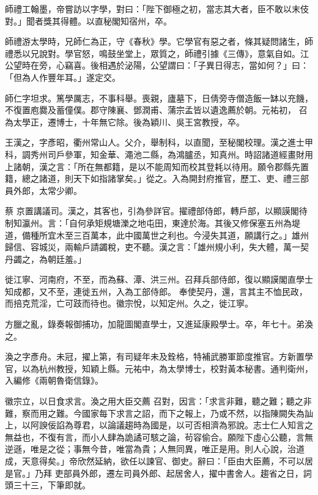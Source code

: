 \begin{pinyinscope}
 師禮工翰墨，帝嘗訪以字學，對曰：「陛下御極之初，當志其大者，臣不敢以末伎
 對。」聞者獎其得體。以直秘閣知宿州，卒。



 師禮游太學時，兄師仁為正，守《春秋》學。它學官有惡之者，條其疑問諸生，師禮悉以兄說對。學官怒，鳴鼓坐堂上，眾質之，師禮引據《三傳》，意氣自如。江公望時在旁，心竊喜。後相遇於泌陽，公望謂曰：「子異日得志，當如何？」曰：「但為人作豐年耳。」遂定交。



 師仁字坦求。篤學厲志，不事科舉。喪親，廬墓下，日倩旁寺僧造飯一缽以充饑，不復置庖爨及蓄僮僕。郡守陳襄、鄧潤甫、蒲宗孟皆以遺逸薦於朝。元祐初，
 召為太學正，遷博士，十年無它除。後為穎川、吳王宮教授，卒。



 王漢之，字彥昭，衢州常山人。父介，舉制科，以直聞，至秘閣校理。漢之進士甲科，調秀州司戶參軍，知金華、澠池二縣，為鴻臚丞，知真州。時詔諸道經畫財用上諸朝，漢之言：「所在無都籍，是以不能周知而校其登耗以待用。願令郡縣先置籍，總之諸道，則天下如指諸掌矣。」從之。入為開封府推官，歷工、吏、禮三部員外郎，太常少卿。



 蔡
 京置講議司。漢之，其客也，引為參詳官。擢禮部侍郎，轉戶部，以顯謨閣待制知瀛州。言：「自何承矩規塘濼之地屯田，東達於海。其後又修保塞五州為堤道，備種所宜木至三百萬本，此中國萬世之利也。今浸失其道，願講行之。」雄州歸信、容城災，兩輸戶請蠲稅，吏不聽。漢之言：「雄州規小利，失大體，萬一契丹蠲之，為朝廷羞。」



 徙江寧、河南府，不至，而為蘇、潭、洪三州。召拜兵部侍郎，復以顯謨閣直學士知成都，又不至，連徙五州，入為工部侍郎。
 奉使契丹，還，言其主不恤民政，而掊克荒淫，亡可跂而待也。徽宗悅，以知定州。久之，徙江寧。



 方臘之亂，錄奏報御捕功，加龍圖閣直學士，又進延康殿學士。卒，年七十。弟渙之。



 渙之字彥舟。未冠，擢上第，有司疑年未及銓格，特補武勝軍節度推官。方新置學官，以為杭州教授，知穎上縣。元祐中，為太學博士，校對黃本秘書。通判衛州，入編修《兩朝魯衛信錄》。



 徽宗立，以日食求言。渙之用大臣交薦
 召對，因言：「求言非難，聽之難；聽之非難，察而用之難。今國家每下求言之詔，而下之報上，乃或不然，以指陳闕失為訕上，以阿諛佞諂為尊君，以論議趨時為國是，以可否相濟為邪說。志士仁人知言之無益也，不復有言，而小人肆為詭譎可駭之論，茍容偷合。願陛下虛心公聽，言無逆遜，唯是之從；事無今昔，唯當為貴；人無同異，唯正是用。則人心說，治道成，天意得矣。」帝欣然延納，欲任以諫官、御史。辭曰：「臣由大臣薦，不可以居是官。」乃拜
 吏部員外郎，遷左司員外郎、起居舍人，擢中書舍人。趨省之日，詞頭三十三，下筆即就。




\end{pinyinscope}
